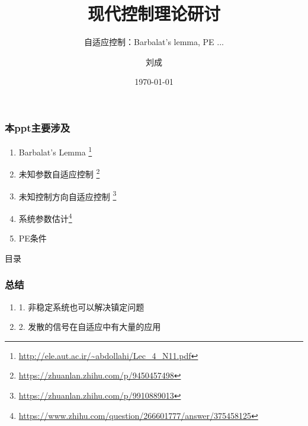 \documentclass{beamer}
\title{现代控制理论研讨}
\subtitle{自适应控制：Barbalat's lemma, PE ...}
\author{刘成}
\institute{中山大学 航空航天学院}
\date{\today}
\begin{document}
\begin{frame}
  \titlepage
\end{frame}

\begin{frame}
  \frametitle{本ppt主要涉及}
  \begin{enumerate}
    \item Barbalat's Lemma \footnote{\url{http://ele.aut.ac.ir/~abdollahi/Lec_4_N11.pdf}}
    \item 未知参数自适应控制 \footnote{\url{https://zhuanlan.zhihu.com/p/9450457498}}
    \item 未知控制方向自适应控制 \footnote{\url{https://zhuanlan.zhihu.com/p/9910889013}}
    \item 系统参数估计\footnote{\url{https://www.zhihu.com/question/266601777/answer/375458125}}
    \item PE条件 
  \end{enumerate}
\end{frame}

\begin{frame}{目录}
  \tableofcontents[sectionstyle=show/shaded, subsectionstyle=show/show/shaded]
\end{frame}






\begin{frame}
  \frametitle{总结}
  \begin{enumerate}
    \item 1. 非稳定系统也可以解决镇定问题
    \item 2. 发散的信号在自适应中有大量的应用
  \end{enumerate}
  
\end{frame}
\end{document}
